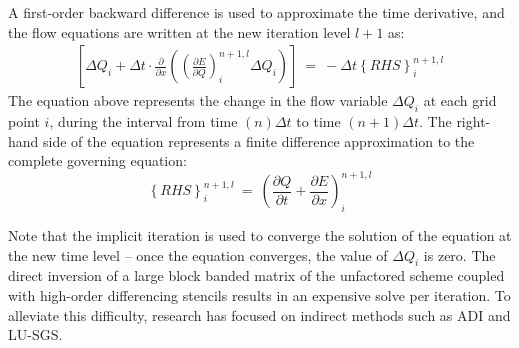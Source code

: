\documentclass[conf]{new-aiaa}
\begin{document}
A first-order backward difference is used to approximate the time derivative, and the flow equations are written at the new iteration level $l+1$ as:
\begin{equation}
	\begin{split}
		\label{eq:NS_DeltaForm}
  			\left[\Delta{Q}_i+\Delta{t}\cdot\frac{\partial}{\partial{x}}\left(\left(\frac{\partial{E}}{\partial{Q}} \right)_i^{n+1,l}\Delta{Q}_i \right)\right]~=~-\Delta{t}\left\{RHS\right\}_i^{n+1, l}
	\end{split}
\end{equation}
The equation above represents the change in the flow variable $\Delta{Q_i}$ at each grid point $i$, during the interval from time $(n)\Delta{t}$ to time $(n+1)\Delta{t}$. The right-hand side of the equation represents a finite difference approximation to the complete governing equation:
\begin{equation*}
	\left\{RHS\right\}_i^{n+1, l}~=~\left(\frac{\partial{Q}}{\partial{t}}+\frac{\partial{E}}{\partial{x}}\right)^{n+1, l}_i
\end{equation*}



Note that the implicit iteration is used to converge the solution of the equation at the new time level – once the equation converges, the value of $\Delta{Q}_i$ is zero. 
The direct inversion of a large block banded matrix of the unfactored scheme coupled with high-order differencing stencils results in an expensive solve per iteration. 
To alleviate this difficulty, research has focused on indirect methods such as ADI and LU-SGS. 
\end{document}
